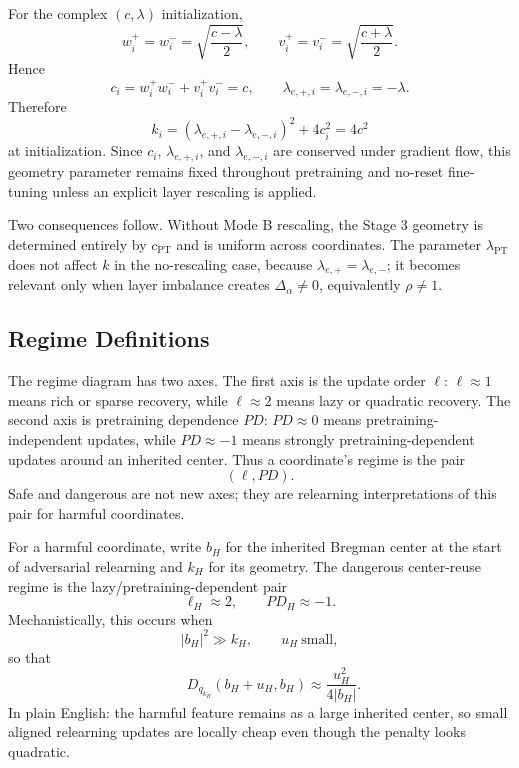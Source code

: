 \documentclass[11pt]{article}
\begin{document}
For the complex \((c,\lambda)\) initialization,
\begin{equation}
    w_i^+=w_i^-=\sqrt{\frac{c-\lambda}{2}},
    \qquad
    v_i^+=v_i^-=\sqrt{\frac{c+\lambda}{2}}.
\end{equation}
Hence
\begin{equation}
    c_i=w_i^+w_i^-+v_i^+v_i^-=c,
    \qquad
    \lambda_{e,+,i}=\lambda_{e,-,i}=-\lambda.
\end{equation}
Therefore
\begin{equation}
    k_i
    =
    (\lambda_{e,+,i}-\lambda_{e,-,i})^2+4c_i^2
    =
    4c^2
\end{equation}
at initialization. Since \(c_i\), \(\lambda_{e,+,i}\), and \(\lambda_{e,-,i}\) are conserved under gradient flow, this geometry parameter remains fixed throughout pretraining and no-reset fine-tuning unless an explicit layer rescaling is applied.

Two consequences follow. Without Mode B rescaling, the Stage 3 geometry is determined entirely by \(c_{\mathrm{PT}}\) and is uniform across coordinates. The parameter \(\lambda_{\mathrm{PT}}\) does not affect \(k\) in the no-rescaling case, because \(\lambda_{e,+}=\lambda_{e,-}\); it becomes relevant only when layer imbalance creates \(\Delta_\alpha\neq0\), equivalently \(\rho\neq1\).

\subsection{Regime Definitions}

The regime diagram has two axes. The first axis is the update order \(\ell\): \(\ell\approx1\) means rich or sparse recovery, while \(\ell\approx2\) means lazy or quadratic recovery. The second axis is pretraining dependence \(PD\): \(PD\approx0\) means pretraining-independent updates, while \(PD\approx-1\) means strongly pretraining-dependent updates around an inherited center. Thus a coordinate's regime is the pair
\begin{equation}
    (\ell,PD).
\end{equation}
Safe and dangerous are not new axes; they are relearning interpretations of this pair for harmful coordinates.

For a harmful coordinate, write \(b_H\) for the inherited Bregman center at the start of adversarial relearning and \(k_H\) for its geometry. The dangerous center-reuse regime is the lazy/pretraining-dependent pair
\begin{equation}
    \ell_H\approx2,
    \qquad
    PD_H\approx-1.
\end{equation}
Mechanistically, this occurs when
\begin{equation}
    |b_H|^2\gg k_H,
    \qquad
    u_H\ \text{small},
\end{equation}
so that
\begin{equation}
    \qquad
    D_{q_{k_H}}(b_H+u_H,b_H)
    \approx
    \frac{u_H^2}{4|b_H|}.
\end{equation}
In plain English: the harmful feature remains as a large inherited center, so small aligned relearning updates are locally cheap even though the penalty looks quadratic.
\end{document}
